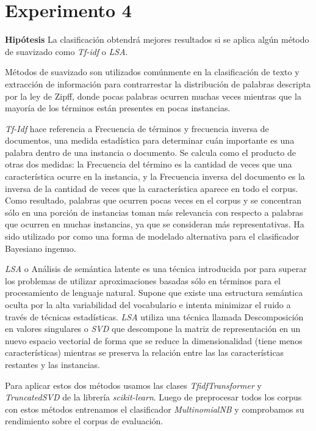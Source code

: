 \section{Experimento 4}
\vspace{3 mm}
\textbf{Hipótesis} La clasificación obtendrá mejores resultados si se aplica algún método de suavizado como \textit{Tf-idf} o \textit{LSA}.
\vspace{3 mm}

Métodos de suavizado son utilizados comúnmente en la clasificación de texto y extracción de información para contrarrestar la distribución de palabras descripta por la ley de Zipff, donde pocas palabras ocurren muchas veces mientras que la mayoría de los términos están presentes en pocas instancias.

\textit{Tf-Idf} hace referencia a Frecuencia de términos y frecuencia inversa de documentos, una medida estadística para determinar cuán importante es una palabra dentro de una instancia o documento. Se calcula como el producto de otras dos medidas: la Frecuencia del término es la cantidad de veces que una característica ocurre en la instancia, y la Frecuencia inversa del documento es la inversa de la cantidad de veces que la característica aparece en todo el corpus. Como resultado, palabras que ocurren pocas veces en el corpus y se concentran sólo en una porción de instancias toman más relevancia con respecto a palabras que ocurren en muchas instancias, ya que se consideran más representativas. Ha sido utilizado por \citet{tackling-mnb} como una forma de modelado alternativa para el clasificador Bayesiano ingenuo.

\textit{LSA} o Análisis de semántica latente es una técnica introducida por \citet{lsa} para superar los problemas de utilizar aproximaciones basadas sólo en términos para el procesamiento de lenguaje natural. Supone que existe una estructura semántica oculta por la alta variabilidad del vocabulario e intenta minimizar el ruido a través de técnicas estadísticas. \textit{LSA} utiliza una técnica llamada Descomposición en valores singulares o \textit{SVD} que descompone la matriz de representación en un nuevo espacio vectorial de forma que se reduce la dimensionalidad (tiene menos características) mientras se preserva la relación entre las las características restantes y las instancias.

Para aplicar estos dos métodos usamos las clases \textit{TfidfTransformer} y \textit{TruncatedSVD} de la librería \textit{scikit-learn}. Luego de preprocesar todos los corpus con estos métodos entrenamos el clasificador \textit{MultinomialNB} y comprobamos su rendimiento sobre el corpus de evaluación.

